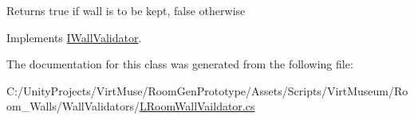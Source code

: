 \begin{DoxyReturn}{Returns}
true if wall is to be kept, false otherwise
\end{DoxyReturn}


Implements \mbox{\hyperlink{interface_i_wall_validator_a1618acf45bf2614985aeb8b240bf7da8}{I\+Wall\+Validator}}.



The documentation for this class was generated from the following file\+:\begin{DoxyCompactItemize}
\item 
C\+:/\+Unity\+Projects/\+Virt\+Muse/\+Room\+Gen\+Prototype/\+Assets/\+Scripts/\+Virt\+Museum/\+Room\+\_\+\+Walls/\+Wall\+Validators/\mbox{\hyperlink{_l_room_wall_vaildator_8cs}{L\+Room\+Wall\+Vaildator.\+cs}}\end{DoxyCompactItemize}
